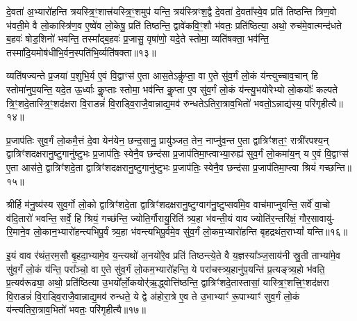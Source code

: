 दे॒वता॑ अ॒भ्यारो॑हन्ति त्रयस्त्रि॒ꣳ॒शात्त्र॑यस्त्रि॒ꣳ॒शमुप॑ यन्ति॒ त्रय॑स्त्रिꣳश॒द्वै दे॒वता॑ दे॒वता᳚स्वे॒व प्रति॑ तिष्ठन्ति त्रिण॒वो भ॑वती॒मे वै लो॒कास्त्रि॑ण॒व ए॒ष्वे॑व लो॒केषु॒ प्रति॑ तिष्ठन्ति॒ द्वावे॑कवि॒ꣳ॒शौ भ॑वतः॒ प्रति॑ष्ठित्या॒ अथो॒ रुच॑मे॒वात्मन्द॑धते ब॒हवः॑ षोड॒शिनो॑ भवन्ति॒ तस्मा᳚द्ब॒हवः॑ प्र॒जासु॒ वृषा॑णो॒ यदे॒ते स्तोमा॒ व्यति॑षक्ता॒ भव॑न्ति॒ तस्मा॑दि॒यमोष॑धीभि॒र्वन॒स्पति॑भि॒र्व्यति॑षक्ता॥१३॥

व्यति॑षज्यन्ते प्र॒जया॑ प॒शुभि॒र्य ए॒वं वि॒द्वाꣳस॑ ए॒ता आस॒ते\-ऽकॢ॑प्ता॒ वा ए॒ते सु॑व॒र्गं लो॒कं य॑न्त्युच्चाव॒चान् हि स्तोमा॑नुप॒यन्ति॒ यदे॒त ऊ॒र्ध्वाः कॢ॒प्ताः स्तोमा॒ भव॑न्ति कॢ॒प्ता ए॒व सु॑व॒र्गं लो॒कं य॑न्त्यु॒भयो॑रेभ्यो लो॒कयोः᳚ कल्पते त्रि॒ꣳ॒शदे॒तास्त्रि॒ꣳ॒शद॑क्षरा वि॒राडन्नं॑ वि॒राड्वि॒राजै॒वान्नाद्य॒मव॑ रुन्धते\-ऽतिरा॒त्राव॒भितो॑ भवतो॒\-ऽन्नाद्य॑स्य॒ परि॑गृहीत्यै॥१४॥

{\anuvakamend[{ओष॑धीः सं वथ्स॒र ए॒वाव॑ प्रति॒ष्ठाय॒ व्यति॑ष॒क्तैका॒न्नप॑ञ्चा॒शच्च॑॥३॥}]}

प्र॒जाप॑तिः सुव॒र्गं लो॒कमै॒त्तं दे॒वा येन॑येन॒ छन्द॒सानु॒ प्रायु॑ञ्जत॒ तेन॒ नाप्नु॑व॒न्त ए॒ता द्वात्रिꣳ॑शत॒ꣳ॒ रात्री॑रपश्य॒न् द्वात्रिꣳ॑शदक्षरानु॒ष्टुगानु॑ष्टुभः प्र॒जाप॑तिः॒ स्वेनै॒व छन्द॑सा प्र॒जाप॑तिमा॒प्त्वाभ्या॒रुह्य॑ सुव॒र्गं लो॒कमा॑य॒न् य ए॒वं वि॒द्वाꣳस॑ ए॒ता आस॑ते॒ द्वात्रिꣳ॑शदे॒ता द्वात्रिꣳ॑शदक्षरानु॒ष्टुगानु॑ष्टुभः प्र॒जाप॑तिः॒ स्वेनै॒व छन्द॑सा प्र॒जाप॑तिमा॒प्त्वा श्रियं॑ गच्छन्ति॥१५॥

श्रीर्\mbox{}हि म॑नु॒ष्य॑स्य सुव॒र्गो लो॒को द्वात्रिꣳ॑शदे॒ता द्वात्रिꣳ॑शदक्षरानु॒ष्टुग्वाग॑नु॒ष्टुप्सर्वा॑मे॒व वाच॑माप्नुवन्ति॒ सर्वे॑ वा॒चो व॑दि॒तारो॑ भवन्ति॒ सर्वे॒ हि श्रियं॒ गच्छ॑न्ति॒ ज्योति॒र्गौरायु॒रिति॑ त्र्य॒हा भ॑वन्ती॒यं वाव ज्योति॑र॒न्तरि॑क्षं॒ गौर॒सावायु॑- रि॒माने॒व लो॒कान॒भ्यारो॑हन्त्यभिपू॒र्वं त्र्य॒हा भ॑वन्त्यभिपू॒र्वमे॒व सु॑व॒र्गं लो॒कम॒भ्यारो॑हन्ति बृहद्रथंत॒रा\-भ्यां᳚ यन्ति॥१६॥

इ॒यं वाव र॑थंत॒रम॒सौ बृ॒हदा॒भ्यामे॒व य॒न्त्यथो॑ अ॒नयो॑रे॒व प्रति॑ तिष्ठन्त्ये॒ते वै य॒ज्ञस्या᳚ञ्ज॒साय॑नी स्रु॒ती ताभ्या॑मे॒व सु॑व॒र्गं लो॒कं य॑न्ति॒ परा᳚ञ्चो॒ वा ए॒ते सु॑व॒र्गं लो॒कम॒भ्यारो॑हन्ति॒ ये परा॑चस्त्र्य॒हानु॑प॒यन्ति॑ प्र॒त्यङ्त्र्य॒हो भ॑वति॒ प्र॒त्यव॑रूढ्या॒ अथो॒ प्रति॑ष्ठित्या उ॒भयो᳚र्लो॒कयोर्\mbox{}॑ऋ॒द्ध्वोत्ति॑ष्ठन्ति॒ द्वात्रिꣳ॑शदे॒तास्तासां॒ यास्त्रि॒ꣳ॒शत्त्रि॒ꣳ॒शद॑क्षरा वि॒राडन्नं॑ वि॒राड्वि॒राजै॒वान्नाद्य॒मव॑ रुन्धते॒ ये द्वे अ॑होरा॒त्रे ए॒व ते उ॒भाभ्याꣳ॑ रू॒पाभ्याꣳ॑ सुव॒र्गं लो॒कं य॑न्त्यतिरा॒त्राव॒भितो॑ भवतः॒ परि॑गृहीत्यै॥१७॥

{\anuvakamend[{ग॒च्छ॒न्ति॒ य॒न्ति॒ त्रि॒ꣳ॒शद॑क्षरा॒ द्वाविꣳ॑शतिश्च॥४॥}]}

